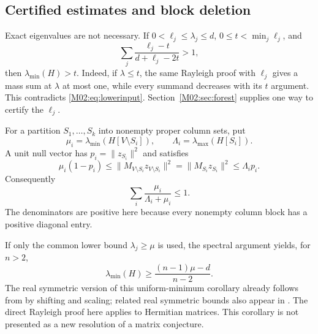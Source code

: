 \documentclass[11pt,a4paper,oneside]{report}
\theoremstyle{definition}
\theoremstyle{remark}
\begin{document}
\subsection{Certified estimates and block deletion}
Exact eigenvalues are not necessary. If \(0<\ell_j\le\lambda_j\le d\), \(0\le t<\min_j\ell_j\), and
\begin{equation}\label{M02:eq:lowerinput}
\sum_j\frac{\ell_j-t}{d+\ell_j-2t}>1,
\end{equation}
then \(\lambda_{\min}(H)>t\). Indeed, if \(\lambda\le t\), the same Rayleigh proof with \(\ell_j\) gives a mass sum at \(\lambda\) at most one, while every summand decreases with its \(t\) argument. This contradicts \eqref{M02:eq:lowerinput}. Section~\ref{M02:sec:forest} supplies one way to certify the \(\ell_j\).

For a partition \(S_1,\ldots,S_k\) into nonempty proper column sets, put
\[
\mu_i=\lambda_{\min}(H[V\setminus S_i]),\qquad
\Lambda_i=\lambda_{\max}(H[S_i]).
\]
A unit null vector has \(p_i=\|z_{S_i}\|^2\) and satisfies
\[
\mu_i(1-p_i)
\le\|M_{V\setminus S_i}z_{V\setminus S_i}\|^2
=\|M_{S_i}z_{S_i}\|^2
\le\Lambda_i p_i.
\]
Consequently
\begin{equation}\label{M02:eq:blockbudget}
\sum_i\frac{\mu_i}{\Lambda_i+\mu_i}\le1.
\end{equation}
The denominators are positive here because every nonempty column block has a positive diagonal entry.

If only the common lower bound \(\lambda_j\ge\mu\) is used, the spectral argument yields, for \(n>2\),
\[
\lambda_{\min}(H)\ge
\frac{(n-1)\mu-d}{n-2}.
\]
The real symmetric version of this uniform-minimum corollary already follows from \cite[Theorem 2.1]{B:BDSS} by shifting and scaling; related real symmetric bounds also appear in \cite{B:FMS}. The direct Rayleigh proof here applies to Hermitian matrices. This corollary is not presented as a new resolution of a matrix conjecture.
\end{document}
